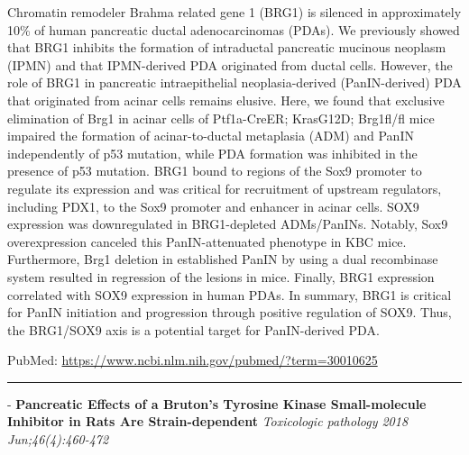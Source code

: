 \documentclass[]{article}
\begin{document}
Chromatin remodeler Brahma related gene 1 (BRG1) is silenced in
approximately 10\% of human pancreatic ductal adenocarcinomas (PDAs). We
previously showed that BRG1 inhibits the formation of intraductal
pancreatic mucinous neoplasm (IPMN) and that IPMN-derived PDA originated
from ductal cells. However, the role of BRG1 in pancreatic
intraepithelial neoplasia-derived (PanIN-derived) PDA that originated
from acinar cells remains elusive. Here, we found that exclusive
elimination of Brg1 in acinar cells of Ptf1a-CreER; KrasG12D; Brg1fl/fl
mice impaired the formation of acinar-to-ductal metaplasia (ADM) and
PanIN independently of p53 mutation, while PDA formation was inhibited
in the presence of p53 mutation. BRG1 bound to regions of the Sox9
promoter to regulate its expression and was critical for recruitment of
upstream regulators, including PDX1, to the Sox9 promoter and enhancer
in acinar cells. SOX9 expression was downregulated in BRG1-depleted
ADMs/PanINs. Notably, Sox9 overexpression canceled this PanIN-attenuated
phenotype in KBC mice. Furthermore, Brg1 deletion in established PanIN
by using a dual recombinase system resulted in regression of the lesions
in mice. Finally, BRG1 expression correlated with SOX9 expression in
human PDAs. In summary, BRG1 is critical for PanIN initiation and
progression through positive regulation of SOX9. Thus, the BRG1/SOX9
axis is a potential target for PanIN-derived PDA.

PubMed: \url{https://www.ncbi.nlm.nih.gov/pubmed/?term=30010625}

{}

{}

\begin{center}\rule{0.5\linewidth}{\linethickness}\end{center}

 - \textbf{Pancreatic Effects of a Bruton's Tyrosine Kinase
Small-molecule Inhibitor in Rats Are Strain-dependent} \emph{Toxicologic
pathology 2018 Jun;46(4):460-472}
\end{document}
